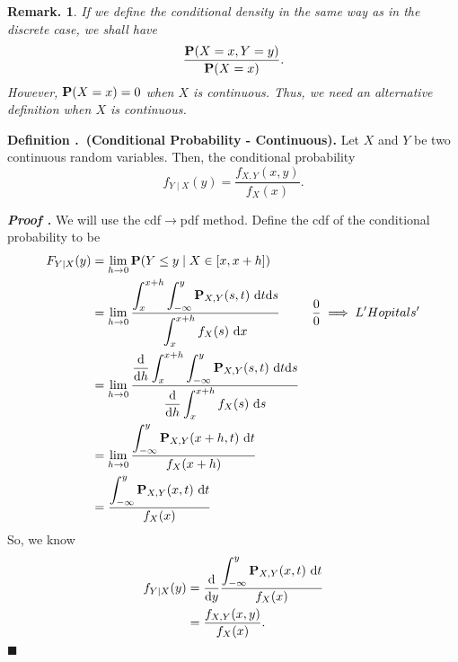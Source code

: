\documentclass[12pt, a4paper]{article}
\newcounter{index}[subsection]
\newenvironment*{df}[1]{\par\noindent\textbf{Definition \thesubsection.\stepcounter{index}\theindex\ (#1).}}{\par}
\newcounter{nprf}[subsection]
\newenvironment*{prf}{\par\indent\textbf{\textit{Proof \stepcounter{nprf}\thenprf.}}}{\hfill$\blacksquare$\par}
\newtheorem*{rmk}{Remark.}
\def\d{\mathrm{d}}
\def\dsst{\displaystyle}
\def\P{\vb{P}}
\begin{document}
\begin{rmk}If we define the conditional density in the same way as in the discrete case, we shall have \[\dfrac{\P(X=x, Y=y)}{\P(X=x)}.\] However, $\P(X=x)=0$ when $X$ is continuous. Thus, we need an alternative definition when $X$ is continuous. \end{rmk}
\begin{df}{Conditional Probability - Continuous}
	Let $X$ and $Y$ be two continuous random variables. Then, the conditional probability \[f_{Y\mid X}(y)=\dfrac{f_{X,Y}(x,y)}{f_X(x)}.\]	
\end{df}
\begin{prf}
	We will use the cdf$\to$pdf method. Define the cdf of the conditional probability to be \begin{align*}F_{Y\mid X}(y)&=\lim_{h\to0}\P(Y\leq y\mid X\in[x,x+h])\\&=\lim_{h\to0}\dfrac{\dsst\int_x^{x+h}\int_{-\infty}^y\P_{X,Y}(s,t)\ \d{t}\d{s}}{\dsst\int_x^{x+h}f_X(s)\ \d{x}}&\dfrac{0}{0}\implies L'Hopitals'\\&=\lim_{h\to0}\dfrac{\dsst\dv{h}\int_x^{x+h}\int_{-\infty}^y\P_{X,Y}(s,t)\ \d{t}\d{s}}{\dsst\dv{h}\int_x^{x+h}f_X(s)\ \d{s}}\\&=\lim_{h\to0}\dfrac{\dsst\int_{-\infty}^y\P_{X,Y}(x+h,t)\ \d{t}}{\dsst f_X(x+h)}\\&=\dfrac{\dsst\int_{-\infty}^y\P_{X,Y}(x,t)\ \d{t}}{f_X(x)}\end{align*}	So, we know \begin{align*}f_{Y\mid X}(y)&=\dv{y}\dfrac{\dsst\int_{-\infty}^y\P_{X,Y}(x,t)\ \d{t}}{f_X(x)}\\&=\dfrac{f_{X,Y}(x,y)}{f_X(x)}.\end{align*}
\end{prf}
\end{document}
